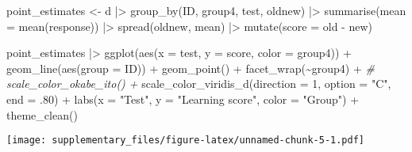 \documentclass[
  man,floatsintext]{apa7}
\newenvironment{Shaded}{\begin{snugshade}}{\end{snugshade}}
\newcommand{\AttributeTok}[1]{\textcolor[rgb]{0.77,0.63,0.00}{#1}}
\newcommand{\CommentTok}[1]{\textcolor[rgb]{0.56,0.35,0.01}{\textit{#1}}}
\newcommand{\DecValTok}[1]{\textcolor[rgb]{0.00,0.00,0.81}{#1}}
\newcommand{\FunctionTok}[1]{\textcolor[rgb]{0.00,0.00,0.00}{#1}}
\newcommand{\NormalTok}[1]{#1}
\newcommand{\OtherTok}[1]{\textcolor[rgb]{0.56,0.35,0.01}{#1}}
\newcommand{\SpecialCharTok}[1]{\textcolor[rgb]{0.00,0.00,0.00}{#1}}
\newcommand{\StringTok}[1]{\textcolor[rgb]{0.31,0.60,0.02}{#1}}
\begin{document}
\begin{Shaded}
\begin{Highlighting}[]
\NormalTok{point\_estimates }\OtherTok{\textless{}{-}}\NormalTok{ d }\SpecialCharTok{|\textgreater{}}
  \FunctionTok{group\_by}\NormalTok{(ID, group4, test, oldnew) }\SpecialCharTok{|\textgreater{}}
  \FunctionTok{summarise}\NormalTok{(}\AttributeTok{mean =} \FunctionTok{mean}\NormalTok{(response)) }\SpecialCharTok{|\textgreater{}}
  \FunctionTok{spread}\NormalTok{(oldnew, mean) }\SpecialCharTok{|\textgreater{}}
  \FunctionTok{mutate}\NormalTok{(}\AttributeTok{score =}\NormalTok{ old }\SpecialCharTok{{-}}\NormalTok{ new)}


\NormalTok{point\_estimates }\SpecialCharTok{|\textgreater{}}
  \FunctionTok{ggplot}\NormalTok{(}\FunctionTok{aes}\NormalTok{(}\AttributeTok{x =}\NormalTok{ test, }\AttributeTok{y =}\NormalTok{ score, }\AttributeTok{color =}\NormalTok{ group4)) }\SpecialCharTok{+}
  \FunctionTok{geom\_line}\NormalTok{(}\FunctionTok{aes}\NormalTok{(}\AttributeTok{group =}\NormalTok{ ID)) }\SpecialCharTok{+}
  \FunctionTok{geom\_point}\NormalTok{() }\SpecialCharTok{+}
  \FunctionTok{facet\_wrap}\NormalTok{(}\SpecialCharTok{\textasciitilde{}}\NormalTok{group4) }\SpecialCharTok{+}
  \CommentTok{\# scale\_color\_okabe\_ito() +}
  \FunctionTok{scale\_color\_viridis\_d}\NormalTok{(}\AttributeTok{direction =} \DecValTok{1}\NormalTok{, }\AttributeTok{option =} \StringTok{"C"}\NormalTok{, }\AttributeTok{end =}\NormalTok{ .}\DecValTok{80}\NormalTok{) }\SpecialCharTok{+}
  \FunctionTok{labs}\NormalTok{(}\AttributeTok{x =} \StringTok{"Test"}\NormalTok{, }\AttributeTok{y =} \StringTok{"Learning score"}\NormalTok{, }\AttributeTok{color =} \StringTok{"Group"}\NormalTok{) }\SpecialCharTok{+}
  \FunctionTok{theme\_clean}\NormalTok{()}
\end{Highlighting}
\end{Shaded}

\texttt{[image: supplementary\_files/figure-latex/unnamed-chunk-5-1.pdf]}
\end{document}
